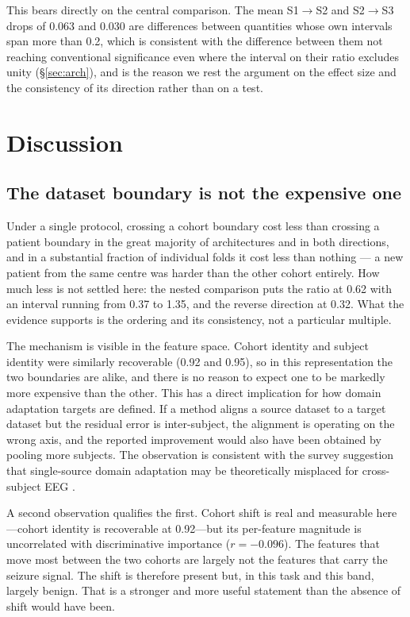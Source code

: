 \documentclass[11pt,a4paper]{article}
\begin{document}
This bears directly on the central comparison. The mean S1$\to$S2 and
S2$\to$S3 drops of 0.063 and 0.030 are differences between quantities whose
own intervals span more than 0.2, which is consistent with the difference
between them not reaching conventional significance even where the interval
on their ratio excludes unity (\S\ref{sec:arch}), and is the reason we rest
the argument on the effect
size and the consistency of its direction rather than on a test.

\section{Discussion}

\subsection{The dataset boundary is not the expensive one}

Under a single protocol, crossing a cohort boundary cost less than crossing
a patient boundary in the great majority of architectures and in both
directions, and in a substantial fraction of individual folds it cost less
than nothing --- a new patient from the same centre was harder than the
other cohort entirely. How much less is not settled here: the nested
comparison puts the ratio at 0.62 with an interval running from 0.37 to
1.35, and the reverse direction at 0.32. What the evidence supports is the
ordering and its consistency, not a particular multiple.

The mechanism is visible in the feature space. Cohort identity and subject
identity were similarly recoverable (0.92 and 0.95), so in this representation
the two boundaries are alike, and there is no reason to expect one to be
markedly more expensive than the other. This has a direct implication for how
domain adaptation targets are defined. If a method aligns a source dataset to
a target dataset but the residual error is inter-subject, the alignment is
operating on the wrong axis, and the reported improvement would also have been
obtained by pooling more subjects. The observation is consistent with the
survey suggestion that single-source domain adaptation may be theoretically
misplaced for cross-subject EEG \citep{crosssubjsurvey2026}.

A second observation qualifies the first. Cohort shift is real and measurable
here---cohort identity is recoverable at 0.92---but its per-feature magnitude
is uncorrelated with discriminative importance ($r=-0.096$). The features that
move most between the two cohorts are largely not the features that carry the
seizure signal. The shift is therefore present but, in this task and this
band, largely benign. That is a stronger and more useful statement than the
absence of shift would have been.
\end{document}
